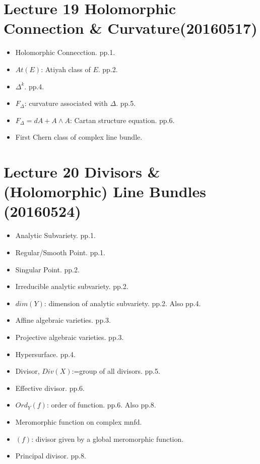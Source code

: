 \section{Lecture 19 Holomorphic Connection \& Curvature(20160517)}
\begin{itemize}
    \item Holomorphic Connecction. pp.1.
    \item $At(E)$: Atiyah class of $E$. pp.2.
    \item $\Delta^k$. pp.4.
    \item $F_\Delta$: curvature associated with $\Delta$. pp.5.
    \item $F_\Delta = dA + A\wedge A$: Cartan structure equation. pp.6.
    \item First Chern class of complex line bundle.
\end{itemize}

\section{Lecture 20 Divisors \& (Holomorphic) Line Bundles (20160524)}
\begin{itemize}
    \item Analytic Subvariety. pp.1.
    \item Regular/Smooth Point. pp.1.
    \item Singular Point. pp.2.
    \item Irreducible analytic subvariety. pp.2.
    \item $dim(Y)$: dimension of analytic subvariety. pp.2. Also pp.4.
    \item Affine algebraic varieties. pp.3.
    \item Projective algebraic varieties. pp.3.
    \item Hypersurface. pp.4.
    \item Divisor, $Div(X)$:=group of all divisors. pp.5.
    \item Effective divisor. pp.6.
    \item $Ord_Y(f)$: order of function. pp.6. Also pp.8.
    \item Meromorphic function on complex mnfd.
    \item $(f)$: divisor given by a global meromorphic function.
    \item Principal divisor. pp.8.
\end{itemize}

